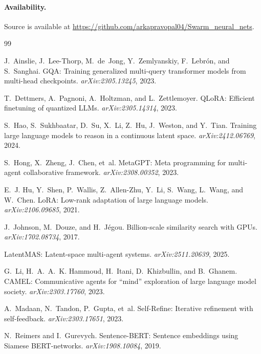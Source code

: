 \documentclass[11pt]{article}
\begin{document}
\paragraph{Availability.} Source is available at
\url{https://github.com/arkapravopal04/Swarm_neural_nets}.

\begin{thebibliography}{99}
\small

J.~Ainslie, J.~Lee-Thorp, M.~de~Jong, Y.~Zemlyanskiy, F.~Lebrón, and S.~Sanghai.
\newblock GQA: Training generalized multi-query transformer models from
  multi-head checkpoints.
\newblock \emph{arXiv:2305.13245}, 2023.

T.~Dettmers, A.~Pagnoni, A.~Holtzman, and L.~Zettlemoyer.
\newblock QLoRA: Efficient finetuning of quantized LLMs.
\newblock \emph{arXiv:2305.14314}, 2023.

S.~Hao, S.~Sukhbaatar, D.~Su, X.~Li, Z.~Hu, J.~Weston, and Y.~Tian.
\newblock Training large language models to reason in a continuous latent space.
\newblock \emph{arXiv:2412.06769}, 2024.

S.~Hong, X.~Zheng, J.~Chen, et~al.
\newblock MetaGPT: Meta programming for multi-agent collaborative framework.
\newblock \emph{arXiv:2308.00352}, 2023.

E.~J. Hu, Y.~Shen, P.~Wallis, Z.~Allen-Zhu, Y.~Li, S.~Wang, L.~Wang, and
  W.~Chen.
\newblock LoRA: Low-rank adaptation of large language models.
\newblock \emph{arXiv:2106.09685}, 2021.

J.~Johnson, M.~Douze, and H.~Jégou.
\newblock Billion-scale similarity search with GPUs.
\newblock \emph{arXiv:1702.08734}, 2017.

LatentMAS: Latent-space multi-agent systems.
\newblock \emph{arXiv:2511.20639}, 2025.

G.~Li, H.~A.~A.~K. Hammoud, H.~Itani, D.~Khizbullin, and B.~Ghanem.
\newblock CAMEL: Communicative agents for ``mind'' exploration of large language
  model society.
\newblock \emph{arXiv:2303.17760}, 2023.

A.~Madaan, N.~Tandon, P.~Gupta, et~al.
\newblock Self-Refine: Iterative refinement with self-feedback.
\newblock \emph{arXiv:2303.17651}, 2023.

N.~Reimers and I.~Gurevych.
\newblock Sentence-BERT: Sentence embeddings using Siamese BERT-networks.
\newblock \emph{arXiv:1908.10084}, 2019.


\end{thebibliography}
\end{document}
